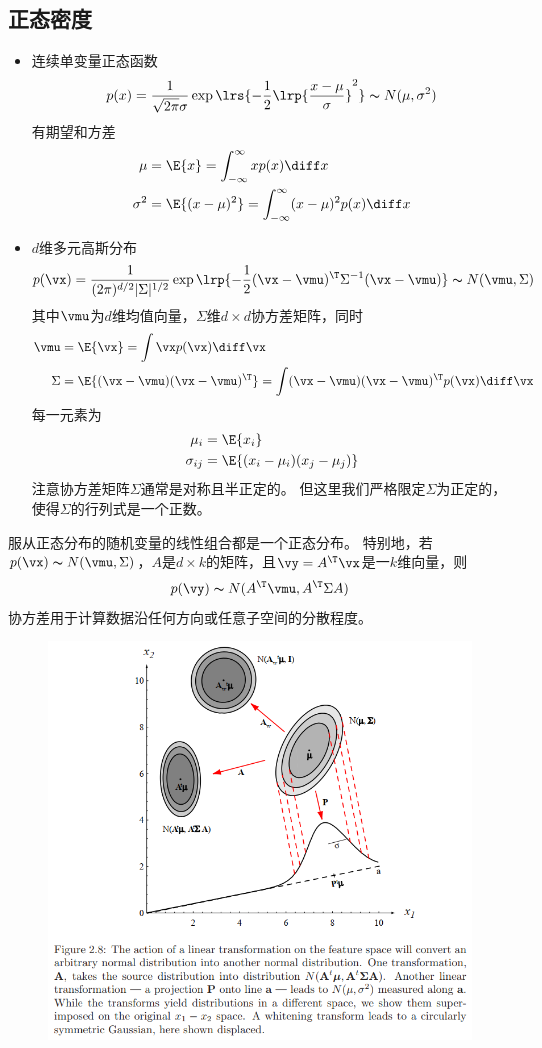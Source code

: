 \subsection{正态密度}
\begin{itemize}
	\item 连续单变量正态函数
\[p(x)=\frac{1}{\sqrt{2\pi}\sigma}\exp\lrs{-\frac{1}{2}\lrp{\frac{x-\mu}{\sigma}}^2}\thicksim N(\mu,\sigma^2)\]
有期望和方差
\[\begin{aligned}
\mu &= \E{x}=\int_{-\infty}^\infty xp(x)\diff x\\
\sigma^2 &=\E{(x-\mu)^2}=\int_{-\infty}^\infty (x-\mu)^2 p(x)\diff x
\end{aligned}\]

	\item $d$维多元高斯分布
\[p(\vx)=\frac{1}{(2\pi)^{d/2}|\Sigma|^{1/2}}\exp\lrp{-\frac{1}{2}(\vx-\vmu)^\T\Sigma^{-1}(\vx-\vmu)}\thicksim N(\vmu,\Sigma)\]
其中$\vmu$为$d$维均值向量，$\Sigma$维$d\times d$协方差矩阵，同时
\[\begin{aligned}
\vmu &=\E{\vx} = \int\vx p(\vx)\diff\vx\\
\Sigma &=\E{(\vx-\vmu)(\vx-\vmu)^\T} = \int(\vx-\vmu)(\vx-\vmu)^\T p(\vx)\diff\vx
\end{aligned}\]
每一元素为
\[\begin{aligned}
\mu_i &= \E{x_i}\\
\sigma_{ij} &= \E{(x_i-\mu_i)(x_j-\mu_j)}
\end{aligned}\]
注意协方差矩阵$\Sigma$通常是对称且半正定的。
但这里我们严格限定$\Sigma$为正定的，使得$\Sigma$的行列式是一个正数。
\end{itemize}

服从正态分布的随机变量的线性组合都是一个正态分布。
特别地，若$p(\vx)\thicksim N(\vmu,\Sigma)$，$A$是$d\times k$的矩阵，且$\vy=A^\T\vx$是一$k$维向量，则
\[p(\vy)\thicksim N(A^\T\vmu,A^\T\Sigma A)\]
协方差用于计算数据沿任何方向或任意子空间的分散程度。
\begin{figure}[H]
\centering
\includegraphics[width=0.8\linewidth]{fig/covariance_matrix.png}
\end{figure}

